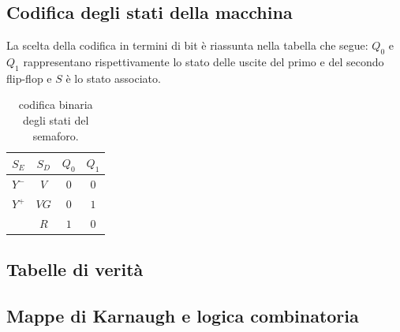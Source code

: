 \documentclass[10pt, a4paper, italian]{article}
\begin{document}
\subsection{Codifica degli stati della macchina}
La scelta della codifica in termini di bit \`e riassunta nella tabella che segue: $Q_0$ e $Q_1$ rappresentano rispettivamente lo stato delle uscite del primo e del secondo flip-flop e $S$ \`e lo stato associato.
\begin{table}[htbp]
	\centering
	\begin{tabular}{cc|cc}
	\toprule
	$S_E$ &	$S_D$ & $Q_0$ &	$Q_1$ \\
	\midrule
	\midrule
	$Y^-$ & $V$  & $0$	&	$0$	\\
	$Y^+$ & $VG$ & $0$	&	$1$	\\
	 	  & $R$  & $1$	&	$0$	\\
	\bottomrule
	\end{tabular}
	\caption{codifica binaria degli stati del semaforo. \label{tab:bit}}
\end{table}
\subsection{Tabelle di verità}

\subsection{Mappe di Karnaugh e logica combinatoria}
\end{document}
